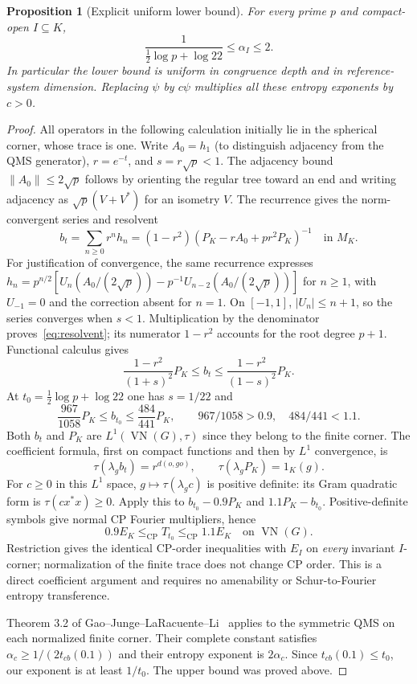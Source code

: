 \documentclass[11pt]{article}
\newtheorem{proposition}[definition]{Proposition}
\theoremstyle{remark}\newtheorem{remark}[definition]{Remark}
\newcommand{\VN}{\operatorname{VN}}
\newcommand{\CP}{\mathrm{CP}}
\begin{document}
\begin{proposition}[Explicit uniform lower bound]\label{prop:uniform}
For every prime $p$ and compact-open $I\subseteq K$,
\begin{equation}\label{eq:uniform}
 \frac1{\frac12\log p+\log22}\leq\alpha_I\leq2.
\end{equation}
In particular the lower bound is uniform in congruence depth and in
reference-system dimension. Replacing $\psi$ by $c\psi$ multiplies all
these entropy exponents by $c>0$.
\end{proposition}
\begin{proof}
All operators in the following calculation initially lie in the spherical
corner, whose trace is one. Write $A_0=h_1$ (to distinguish adjacency
from the QMS generator), $r=e^{-t}$, and $s=r\sqrt p<1$.
The adjacency bound $\|A_0\|\leq2\sqrt p$ follows by orienting the
regular tree toward an end and writing adjacency as
$\sqrt p(V+V^*)$ for an isometry $V$.
The recurrence gives the norm-convergent series and resolvent
\begin{equation}\label{eq:resolvent}
 b_t=\sum_{n\geq0}r^n h_n
 =(1-r^2)(P_K-rA_0+pr^2P_K)^{-1}\quad\text{in }M_K.
\end{equation}
For justification of convergence, the same recurrence expresses
$h_n=p^{n/2}[U_n(A_0/(2\sqrt p))-p^{-1}U_{n-2}(A_0/(2\sqrt p))]$
for $n\geq1$, with $U_{-1}=0$ and the correction absent for $n=1$.
On $[-1,1]$, $|U_n|\leq n+1$, so the series converges when $s<1$.
Multiplication by the denominator proves~\eqref{eq:resolvent}; its
numerator $1-r^2$ accounts for the root degree $p+1$.
Functional calculus gives
\[
 \frac{1-r^2}{(1+s)^2}P_K\leq b_t\leq
 \frac{1-r^2}{(1-s)^2}P_K.
\]
At $t_0=\tfrac12\log p+\log22$ one has $s=1/22$ and
\[
 \frac{967}{1058}P_K\leq b_{t_0}\leq\frac{484}{441}P_K,
 \qquad 967/1058>0.9,\quad484/441<1.1.
\]
Both $b_t$ and $P_K$ are $L^1(\VN(G),\tau)$ since they belong to the
finite corner. The coefficient formula, first on compact functions and
then by $L^1$ convergence, is
\[
 \tau(\lambda_g b_t)=r^{d(o,go)},\qquad
 \tau(\lambda_g P_K)=1_K(g).
\]
For $c\geq0$ in this $L^1$ space, $g\mapsto\tau(\lambda_g c)$ is
positive definite: its Gram quadratic form is $\tau(c x^*x)\geq0$.
Apply this to $b_{t_0}-0.9P_K$ and $1.1P_K-b_{t_0}$. Positive-definite
symbols give normal CP Fourier multipliers, hence
\[
 0.9E_K\leq_{\CP}T_{t_0}\leq_{\CP}1.1E_K
 \quad\text{on }\VN(G).
\]
Restriction gives the identical CP-order inequalities with $E_I$ on
\emph{every} invariant $I$-corner; normalization of the finite trace does
not change CP order. This is a direct coefficient argument and requires
no amenability or Schur-to-Fourier entropy transference.

Theorem 3.2 of Gao--Junge--LaRacuente--Li~\cite{GaoJungeLaRacuenteLi2025}
applies to the symmetric QMS on each normalized finite corner. Their
complete constant satisfies $\alpha_c\geq1/(2t_{cb}(0.1))$ and their
entropy exponent is $2\alpha_c$. Since $t_{cb}(0.1)\leq t_0$, our
exponent is at least $1/t_0$. The upper bound was proved above.
\end{proof}
\end{document}
